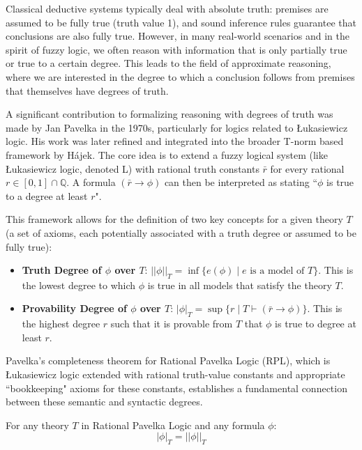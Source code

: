 Classical deductive systems typically deal with absolute truth: premises are assumed to be fully true (truth value 1), and sound inference rules guarantee that conclusions are also fully true. However, in many real-world scenarios and in the spirit of fuzzy logic, we often reason with information that is only partially true or true to a certain degree. This leads to the field of approximate reasoning, where we are interested in the degree to which a conclusion follows from premises that themselves have degrees of truth.

A significant contribution to formalizing reasoning with degrees of truth was made by Jan Pavelka in the 1970s, particularly for logics related to Łukasiewicz logic. His work was later refined and integrated into the broader T-norm based framework by Hájek. The core idea is to extend a fuzzy logical system (like Łukasiewicz logic, denoted L) with rational truth constants $\bar{r}$ for every rational $r \in [0,1] \cap \mathbb{Q}$. A formula $(\bar{r} \rightarrow \phi)$ can then be interpreted as stating ``$\phi$ is true to a degree at least $r$".

This framework allows for the definition of two key concepts for a given theory $T$ (a set of axioms, each potentially associated with a truth degree or assumed to be fully true):

\begin{itemize}
    \item \textbf{Truth Degree of $\phi$ over $T$}: $||\phi||_T = \inf\{e(\phi) \mid e \text{ is a model of } T\}$. This is the lowest degree to which $\phi$ is true in all models that satisfy the theory $T$.
    \item \textbf{Provability Degree of $\phi$ over $T$}: $|\phi|_T = \sup\{r \mid T \vdash (\bar{r} \rightarrow \phi)\}$. This is the highest degree $r$ such that it is provable from $T$ that $\phi$ is true to degree at least $r$.
\end{itemize}

Pavelka's completeness theorem for Rational Pavelka Logic (RPL), which is Łukasiewicz logic extended with rational truth-value constants and appropriate ``bookkeeping" axioms for these constants, establishes a fundamental connection between these semantic and syntactic degrees.

\begin{theorem}
For any theory $T$ in Rational Pavelka Logic and any formula $\phi$:
\[
 |\phi|_T = ||\phi||_T 
\]
\end{theorem}

